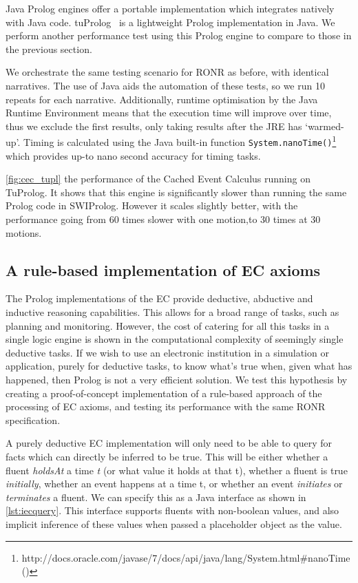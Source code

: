 Java Prolog engines offer a portable implementation which integrates natively
with Java code. tuProlog~\citep{Denti2005} is a lightweight Prolog
implementation in Java. We perform another performance test using this Prolog
engine to compare to those in the previous section.

We orchestrate the same testing scenario for \ac{RONR} as before, with
identical narratives. The use of Java aids the automation of these tests, so
we run 10 repeats for each narrative. Additionally, runtime optimisation by
the Java Runtime Environment means that the execution time will improve over
time, thus we exclude the first results, only taking results after the JRE has
`warmed-up'. Timing is calculated using the Java built-in function
\texttt{System.nanoTime()}\footnote{http://docs.oracle.com/javase/7/docs/api/java/lang/System.html\#nanoTime()} 
which provides up-to nano second accuracy for timing tasks.

\autoref{fig:cec_tupl} the performance of the Cached Event Calculus running on
TuProlog. It shows that this engine is significantly slower than running the
same Prolog code in SWIProlog. However it scales slightly better, with the
performance going from 60 times slower with one motion,to 30 times at 30
motions.

\subsection{A rule-based implementation of EC axioms}

The Prolog implementations of the \ac{EC} provide deductive, abductive and
inductive reasoning capabilities. This allows for a broad range of tasks, such
as planning and monitoring. However, the cost of catering for all this tasks
in a single logic engine is shown in the computational complexity of seemingly
single deductive tasks. If we wish to use an electronic institution in a
simulation or application, purely for deductive tasks, to know what's true
when, given what has happened, then Prolog is not a very efficient solution.
We test this hypothesis by creating a proof-of-concept implementation of a
rule-based approach of the processing of \ac{EC} axioms, and testing its
performance with the same \ac{RONR} specification.

A purely deductive \ac{EC} implementation will only need to be able to query
for facts which can directly be inferred to be true. This will be either
whether a fluent \emph{holdsAt} a time \emph{t} (or what value it holds at
that t), whether a fluent is true \emph{initially}, whether an event happens
at a time t, or whether an event \emph{initiates} or \emph{terminates} a
fluent. We can specify this as a Java interface as shown in
\autoref{lst:iecquery}. This interface supports fluents with non-boolean
values, and also implicit inference of these values when passed a placeholder
object as the value.

